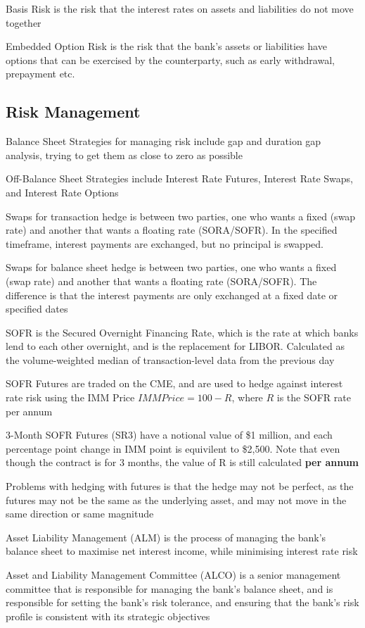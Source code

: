 Basis Risk is the risk that the interest rates on assets and liabilities do not move together

Embedded Option Risk is the risk that the bank's assets or liabilities have options that can be exercised by the counterparty, such as early withdrawal, prepayment etc.

\subsection{Risk Management}
Balance Sheet Strategies for managing risk include gap and duration
gap analysis, trying to get them as close to zero as possible

Off-Balance Sheet Strategies include Interest Rate Futures, Interest Rate Swaps, and Interest Rate Options

Swaps for transaction hedge is between two parties, one who wants a fixed (swap rate) and another that wants a floating rate (SORA/SOFR).
In the specified timeframe, interest payments are exchanged, but no principal is swapped.

Swaps for balance sheet hedge is between two parties, one who wants a fixed (swap rate) and another that wants a floating rate (SORA/SOFR).
The difference is that the interest payments are only exchanged at a fixed date or specified dates

SOFR is the Secured Overnight Financing Rate, which is the rate at which banks lend to each other overnight, and is the replacement for LIBOR.
Calculated as the volume-weighted median of transaction-level data from the previous day

SOFR Futures are traded on the CME, and are used to hedge against interest rate risk using the IMM Price
$IMM Price = 100 - R$, where $R$ is the SOFR rate per annum

3-Month SOFR Futures (SR3) have a notional value of \$1 million, and each percentage point change in IMM point is equivilent to \$2,500. Note that even though the contract is for 3 months, the value of R is still calculated \textbf{per annum}

Problems with hedging with futures is that the hedge may not be perfect, as the futures may not be the same as the underlying asset, and may not move in the same direction or same magnitude

Asset Liability Management (ALM) is the process of managing the bank's balance sheet to maximise net interest income, while minimising interest rate risk

Asset and Liability Management Committee (ALCO) is a senior management committee that is responsible for managing the bank's balance sheet, and is responsible for setting the bank's risk tolerance, and ensuring that the bank's risk profile is consistent with its strategic objectives

